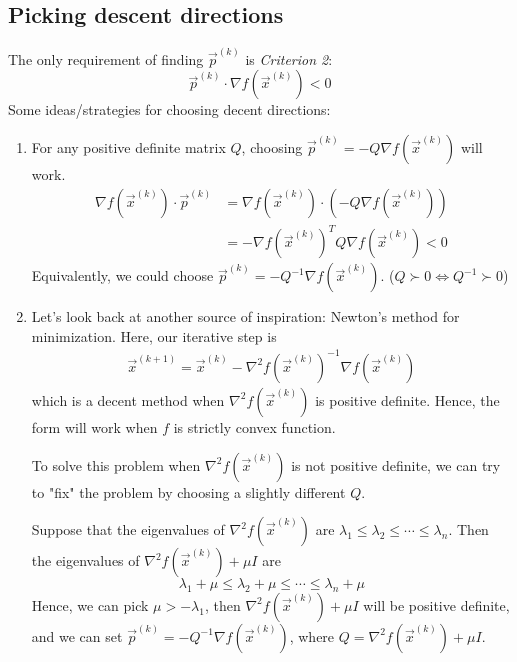 \documentclass[11pt]{elegantbook}
\begin{document}
\subsection{Picking descent directions}
The only requirement of finding $\vec{p}^{(k)}$ is \textit{Criterion 2}: $$\vec{p}^{(k)}\cdot \nabla f(\vec{x}^{(k)})<0$$
Some ideas/strategies for choosing decent directions:
\begin{enumerate}[(1)]
    \item For any positive definite matrix $Q$, choosing $\vec{p}^{(k)}=-Q \nabla f(\vec{x}^{(k)})$ will work.
    \begin{equation}
        \begin{aligned}
            \nabla f(\vec{x}^{(k)})\cdot \vec{p}^{(k)}&=\nabla f(\vec{x}^{(k)})\cdot\left(-Q \nabla f(\vec{x}^{(k)})\right)\\
            &=-\nabla f(\vec{x}^{(k)})^TQ\nabla f(\vec{x}^{(k)})<0
        \end{aligned}
        \nonumber
    \end{equation}
    Equivalently, we could choose $\vec{p}^{(k)}=-Q^{-1}\nabla f(\vec{x}^{(k)})$. ($Q\succ 0 \Leftrightarrow Q^{-1}\succ 0$)
    \item Let's look back at another source of inspiration: Newton's method for minimization. Here, our iterative step is
    \begin{equation}
        \begin{aligned}
            \vec{x}^{(k+1)}=\vec{x}^{(k)}-\nabla^2 f(\vec{x}^{(k)})^{-1}\nabla f(\vec{x}^{(k)})
        \end{aligned}
        \nonumber
    \end{equation}
    which is a decent method when $\nabla^2 f(\vec{x}^{(k)})$ is positive definite. Hence, the form will work when $f$ is strictly convex function.

    To solve this problem when $\nabla^2 f(\vec{x}^{(k)})$ is not positive definite, we can try to "fix" the problem by choosing a slightly different $Q$.
    
    Suppose that the eigenvalues of $\nabla^2 f(\vec{x}^{(k)})$ are $\lambda_1\leq \lambda_2\leq \cdots\leq \lambda_n$. Then the eigenvalues of $\nabla^2 f(\vec{x}^{(k)})+\mu I$ are $$\lambda_1+\mu\leq \lambda_2+\mu\leq \cdots\leq \lambda_n+\mu$$ Hence, we can pick $\mu>-\lambda_1$, then $\nabla^2 f(\vec{x}^{(k)})+\mu I$ will be positive definite, and we can set $\vec{p}^{(k)}=-Q^{-1}\nabla f(\vec{x}^{(k)})$, where $Q=\nabla^2 f(\vec{x}^{(k)})+\mu I$.
\end{enumerate}
\end{document}
